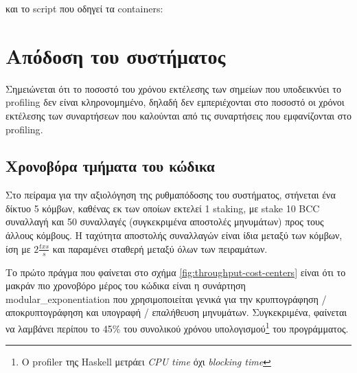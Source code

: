 \documentclass{article}
\newcommand{\eng}[1]{\foreignlanguage{english}{#1}} %
\begin{document}


και το \eng{script} που οδηγεί τα \eng{containers}:





\section{Απόδοση του συστήματος}

Σημειώνεται ότι το ποσοστό του χρόνου εκτέλεσης των σημείων που υποδεικνύει το
\eng{profiling} δεν είναι κληρονομημένο, δηλαδή δεν εμπεριέχονται στο ποσοστό
οι χρόνοι εκτέλεσης των συναρτήσεων που καλούνται από τις συναρτήσεις που
εμφανίζονται στο \eng{profiling}.

\subsection{Χρονοβόρα τμήματα του κώδικα}

Στο πείραμα για την αξιολόγηση της ρυθμαπόδοσης του συστήματος, στήνεται ένα
δίκτυο 5 κόμβων, καθένας εκ των οποίων εκτελεί 1 \eng{staking}, με \eng{stake
10 BCC} συναλλαγή και 50 συναλλαγές (συγκεκριμένα αποστολές μηνυμάτων) προς
τους άλλους κόμβους. Η ταχύτητα αποστολής συναλλαγών είναι ίδια μεταξύ των
κόμβων, ίση με $2\frac{txs}{s}$ και παραμένει σταθερή μεταξύ όλων των
πειραμάτων.

Το πρώτο πράγμα που φαίνεται στο σχήμα \ref{fig:throughput-cost-centers} είναι
ότι το μακράν πιο χρονοβόρο μέρος του κώδικα είναι η συνάρτηση
\eng{modular\_exponentiation} που χρησιμοποιείται γενικά για την κρυπτογράφηση
/ αποκρυπτογράφηση και υπογραφή / επαλήθευση μηνυμάτων. Συγκεκριμένα, φαίνεται
να λαμβάνει περίπου το 45\% του συνολικού χρόνου υπολογισμού\footnote{Ο
\eng{profiler} της \eng{Haskell} μετράει \emph{\eng{CPU time}} όχι
\emph{\eng{blocking time}}} του προγράμματος.

\graphicspath{{../experiments/profiled\_outputs/docker/throughput/}}
\end{document}
